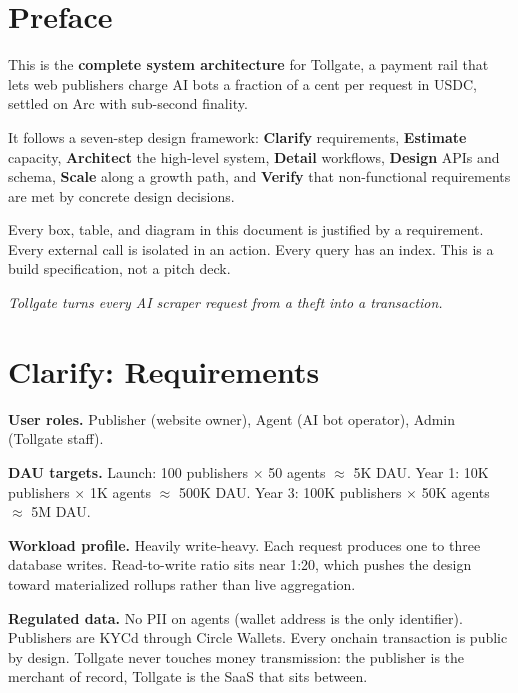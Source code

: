 \documentclass[11pt,a4paper]{article}
\newcommand{\iconGate}{\textcolor{tollgatepink}{\faDoorOpen}}
\newcommand{\iconStar}{\textcolor{tollgategold}{\faStar}}
\newcommand{\iconCog}{\textcolor{tollgateslate}{\faCog}}
\begin{document}
\section*{Preface}

\begin{tollbox}[title={\iconGate~ What this document is}]
This is the \textbf{complete system architecture} for Tollgate, a payment rail that lets web publishers charge AI bots a fraction of a cent per request in USDC, settled on Arc with sub-second finality.

It follows a seven-step design framework: \textbf{Clarify} requirements, \textbf{Estimate} capacity, \textbf{Architect} the high-level system, \textbf{Detail} workflows, \textbf{Design} APIs and schema, \textbf{Scale} along a growth path, and \textbf{Verify} that non-functional requirements are met by concrete design decisions.

Every box, table, and diagram in this document is justified by a requirement. Every external call is isolated in an action. Every query has an index. This is a build specification, not a pitch deck.
\end{tollbox}

\begin{highlightbox}[title={\iconStar~ The single sentence we repeat}]
\centering
\large\itshape Tollgate turns every AI scraper request from a theft into a transaction.
\end{highlightbox}

\newpage

\section{Clarify: Requirements}

\begin{archbox}[title={\iconCog~ Context answered first}]
\textbf{User roles.} Publisher (website owner), Agent (AI bot operator), Admin (Tollgate staff).

\textbf{DAU targets.} Launch: 100 publishers $\times$ 50 agents $\approx$ 5K DAU. Year 1: 10K publishers $\times$ 1K agents $\approx$ 500K DAU. Year 3: 100K publishers $\times$ 50K agents $\approx$ 5M DAU.

\textbf{Workload profile.} Heavily write-heavy. Each request produces one to three database writes. Read-to-write ratio sits near 1:20, which pushes the design toward materialized rollups rather than live aggregation.

\textbf{Regulated data.} No PII on agents (wallet address is the only identifier). Publishers are KYCd through Circle Wallets. Every onchain transaction is public by design. Tollgate never touches money transmission: the publisher is the merchant of record, Tollgate is the SaaS that sits between.
\end{archbox}
\end{document}
